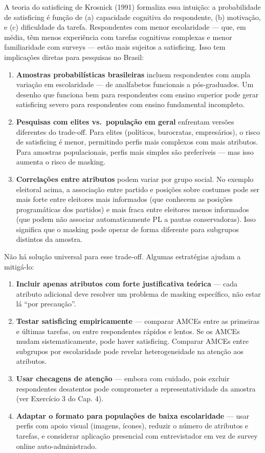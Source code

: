 \documentclass[
]{article}
\providecommand{\tightlist}{%
  \setlength{\itemsep}{0pt}\setlength{\parskip}{0pt}}
\begin{document}
A teoria do satisficing de Krosnick (1991) formaliza essa intuição: a probabilidade de satisficing é função de (a) capacidade cognitiva do respondente, (b) motivação, e (c) dificuldade da tarefa. Respondentes com menor escolaridade --- que, em média, têm menos experiência com tarefas cognitivas complexas e menor familiaridade com surveys --- estão mais sujeitos a satisficing. Isso tem implicações diretas para pesquisas no Brasil:

\begin{enumerate}
\def\labelenumi{\arabic{enumi}.}
\item
  \textbf{Amostras probabilísticas brasileiras} incluem respondentes com ampla variação em escolaridade --- de analfabetos funcionais a pós-graduados. Um desenho que funciona bem para respondentes com ensino superior pode gerar satisficing severo para respondentes com ensino fundamental incompleto.
\item
  \textbf{Pesquisas com elites vs.~população em geral} enfrentam versões diferentes do trade-off. Para elites (políticos, burocratas, empresários), o risco de satisficing é menor, permitindo perfis mais complexos com mais atributos. Para amostras populacionais, perfis mais simples são preferíveis --- mas isso aumenta o risco de masking.
\item
  \textbf{Correlações entre atributos} podem variar por grupo social. No exemplo eleitoral acima, a associação entre partido e posições sobre costumes pode ser mais forte entre eleitores mais informados (que conhecem as posições programáticas dos partidos) e mais fraca entre eleitores menos informados (que podem não associar automaticamente PL a pautas conservadoras). Isso significa que o masking pode operar de forma diferente para subgrupos distintos da amostra.
\end{enumerate}

Não há solução universal para esse trade-off. Algumas estratégias ajudam a mitigá-lo:

\begin{enumerate}
\def\labelenumi{\arabic{enumi}.}
\tightlist
\item
  \textbf{Incluir apenas atributos com forte justificativa teórica} --- cada atributo adicional deve resolver um problema de masking específico, não estar lá ``por precaução''.
\item
  \textbf{Testar satisficing empiricamente} --- comparar AMCEs entre as primeiras e últimas tarefas, ou entre respondentes rápidos e lentos. Se os AMCEs mudam sistematicamente, pode haver satisficing. Comparar AMCEs entre subgrupos por escolaridade pode revelar heterogeneidade na atenção aos atributos.
\item
  \textbf{Usar checagens de atenção} --- embora com cuidado, pois excluir respondentes desatentos pode comprometer a representatividade da amostra (ver Exercício 3 do Cap. 4).
\item
  \textbf{Adaptar o formato para populações de baixa escolaridade} --- usar perfis com apoio visual (imagens, ícones), reduzir o número de atributos e tarefas, e considerar aplicação presencial com entrevistador em vez de survey online auto-administrado.
\end{enumerate}
\end{document}
